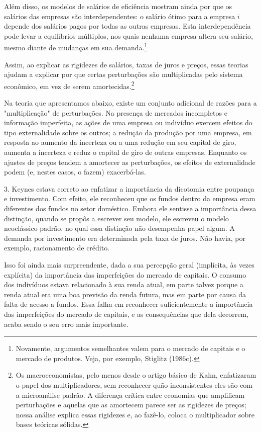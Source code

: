 \documentclass[12pt]{article}
\begin{document}
Além disso, os modelos de salários de eficiência mostram ainda por que os salários das empresas são interdependentes: o salário ótimo para a empresa $i$ depende dos salários pagos por todas as outras empresas. Esta interdependência pode levar a equilíbrios múltiplos, nos quais nenhuma empresa altera seu salário, mesmo diante de mudanças em sua demanda.\footnote{Novamente, argumentos semelhantes valem para o mercado de capitais e o mercado de produtos. Veja, por exemplo, Stiglitz (1986c).}

Assim, ao explicar as rigidezes de salários, taxas de juros e preços, essas teorias ajudam a explicar por que certas perturbações são multiplicadas pelo sistema econômico, em vez de serem amortecidas.\footnote{Os macroeconomistas, pelo menos desde o artigo básico de Kahn, enfatizaram o papel dos multiplicadores, sem reconhecer quão inconsistentes eles são com a microanálise padrão. A diferença crítica entre economias que amplificam perturbações e aquelas que as amortecem parece ser as rigidezes de preços; nossa análise explica essas rigidezes e, ao fazê-lo, coloca o multiplicador sobre bases teóricas sólidas.}

Na teoria que apresentamos abaixo, existe um conjunto adicional de razões para a "multiplicação" de perturbações. Na presença de mercados incompletos e informação imperfeita, as ações de uma empresa ou indivíduo exercem efeitos do tipo externalidade sobre os outros; a redução da produção por uma empresa, em resposta ao aumento da incerteza ou a uma redução em seu capital de giro, aumenta a incerteza e reduz o capital de giro de outras empresas. Enquanto os ajustes de preços tendem a amortecer as perturbações, os efeitos de externalidade podem (e, nestes casos, o fazem) exacerbá-las.

3. Keynes estava correto ao enfatizar a importância da dicotomia entre poupança e investimento. Com efeito, ele reconheceu que os fundos dentro da empresa eram diferentes dos fundos no setor doméstico. Embora ele sentisse a importância dessa distinção, quando se propôs a escrever seu modelo, ele escreveu o modelo neoclássico padrão, no qual essa distinção não desempenha papel algum. A demanda por investimento era determinada pela taxa de juros. Não havia, por exemplo, racionamento de crédito.

Isso foi ainda mais surpreendente, dada a sua percepção geral (implícita, às vezes explícita) da importância das imperfeições do mercado de capitais. O consumo dos indivíduos estava relacionado à sua renda atual, em parte talvez porque a renda atual era uma boa previsão da renda futura, mas em parte por causa da falta de acesso a fundos. Essa falha em reconhecer suficientemente a importância das imperfeições do mercado de capitais, e as consequências que dela decorrem, acaba sendo o seu erro mais importante.
\end{document}
